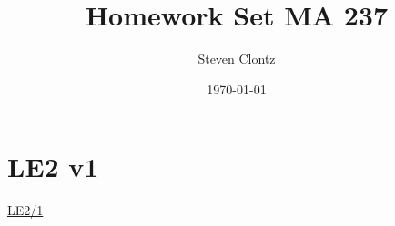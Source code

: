 \documentclass{article} %
\title{Homework Set MA 237} %
\author{Steven Clontz} %
\date{\today} %
\begin{document}
\maketitle %

\section{LE2 v1} %

\href{https://teambasedinquirylearning.github.io/linear-algebra/2023/exercises/#/bank/LE2/1/}{LE2/1}

\providecommand{\stxKnowl}{}\renewcommand{\stxKnowl}[1]{#1}
\providecommand{\stxOuttro}{}\renewcommand{\stxOuttro}[1]{#1}
\providecommand{\stxTitle}{}\renewcommand{\stxTitle}[1]{#1}
\renewcommand{\stxOuttro}[1]{}
\end{document}

